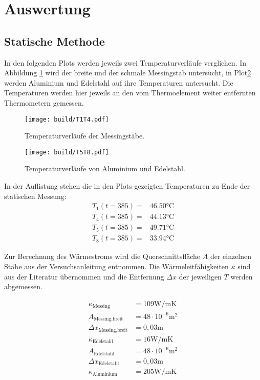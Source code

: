 \section{Auswertung}
\label{sec:Auswertung}


\subsection{Statische Methode}
In den folgenden Plots werden jeweils zwei Temperaturverläufe verglichen. In Abbildung \ref{fig:t1t4} wird der breite und der schmale 
Messingstab untersucht, in Plot\ref{fig:t5t8} werden Aluminium und Edelstahl auf ihre Temperaturen untersucht. Die Temperaturen werden hier jeweils
an den vom Thermoelement weiter entfernten Thermometern gemessen.

\begin{figure}[H]
    \centering
    \texttt{[image: build/T1T4.pdf]}
    \caption{Temperaturverläufe der Messingstäbe.}
    \label{fig:t1t4}
\end{figure}

\begin{figure}[H]
    \centering
    \texttt{[image: build/T5T8.pdf]}
    \caption{Temperaturverläufe von Aluminium und Edelstahl.}
    \label{fig:t5t8}
\end{figure}

In der Auflistung stehen die in den Plots gezeigten Temperaturen zu Ende der statischen Messung:
\begin{align*}
T_1(t=385) =& 46.50 \si{\celsius}\\
T_4(t=385) =& 44.13 \si{\celsius}\\
T_5(t=385) =& 49.71 \si{\celsius}\\
T_8(t=385) =& 33.94 \si{\celsius}
\end{align*}


Zur Berechnung des Wärmestroms wird die Querschnittsfläche $A$ der einzelnen Stäbe aus der Versuchsanleitung entnommen.
Die Wärmeleitfähigkeiten $\kappa$ sind aus der Literatur\cite{V204} übernommen und die Entfernung $\Delta x$ der jeweiligen $T$ 
werden abgemessen.

\begin{align*}
\kappa _\text{Messing}& = 109\si{\watt\per\meter\kelvin} \\
A_\text{Messing,breit}& = 48\cdot 10^{-6}\si{\meter\squared} \\
\Delta x_\text{Messing,breit}& = 0,03\si{\meter} \\
\kappa _\text{Edelstahl}& = 16\si{\watt\per\meter\kelvin} \\
A_\text{Edelstahl}& = 48\cdot 10^{-6}\si{\meter\squared} \\
\Delta x_\text{Edelstahl}& = 0,03\si{\meter} \\
\kappa_\text{Aluminium}& = 205 \si{\watt\per\meter\kelvin}
\end{align*}

